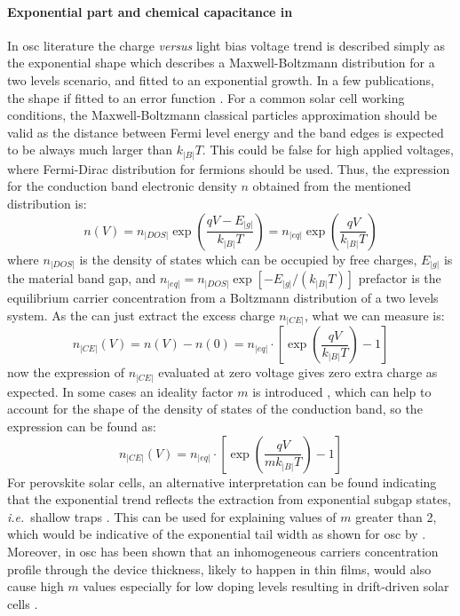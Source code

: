 		\paragraph{Exponential part and chemical capacitance in }\label{ce_exp_osc}
		In \gls{osc} literature the charge \textsl{versus} light bias voltage trend is described simply as the exponential shape which describes a Maxwell\hyp{}Boltzmann distribution for a two levels scenario, and fitted to an exponential growth.
		In a few publications, the shape if fitted to an error function \cite{Ajuria2011}.
		For a common solar cell working conditions, the Maxwell\hyp{}Boltzmann classical particles approximation should be valid as the distance between Fermi level energy and the band edges is expected to be always much larger than $k_|B|T$.
		This could be false for high applied voltages, where Fermi\hyp{}Dirac distribution for fermions should be used.
		Thus, the expression for the conduction band electronic density $n$ obtained from the mentioned distribution is:
		\begin{equation}
			n(V) = n_|DOS| \exp(\frac{qV - E_|g|}{k_|B|T}) = n_|eq| \exp(\frac{qV}{k_|B|T})
		\end{equation}
		where $n_|DOS|$ is the density of states which can be occupied by free charges, $E_|g|$ is the material band gap, and $n_|eq|=n_|DOS|\exp[-E_|g|/(k_|B|T)]$ prefactor is the equilibrium carrier concentration from a Boltzmann distribution of a two levels system.
		As the  can just extract the excess charge $n_|CE|$, what we can measure is:
		\begin{equation}
			n_|CE|(V) = n(V)-n(0) = n_|eq| \cdot \left[\exp(\frac{qV}{k_|B|T})-1\right]
		\end{equation}
		now the expression of $n_|CE|$ evaluated at zero voltage gives zero extra charge as expected.
		In some cases an ideality factor $m$ is introduced \cite{Kirchartz2012}, which can help to account for the shape of the density of states of the conduction band, so the expression can be found as:
		\begin{equation}\label{eq:ce_osc}
			n_|CE|(V) = n_|eq| \cdot \left[\exp(\frac{qV}{mk_|B|T})-1\right]
		\end{equation}
		For perovskite solar cells, an alternative interpretation can be found indicating that the exponential trend reflects the extraction from exponential subgap states, \textsl{i.e.}\ shallow traps \cite{Du2018}.
		This can be used for explaining values of $m$ greater than 2, which would be indicative of the exponential tail width as shown for \gls{osc} by .
		Moreover, in \gls{osc} has been shown that an inhomogeneous carriers concentration profile through the device thickness, likely to happen in thin films, would also cause high $m$ values \cite{Kirchartz2012} especially for low doping levels resulting in drift\hyp{}driven solar cells \cite{Deledalle2015,Deledalle2014}.



